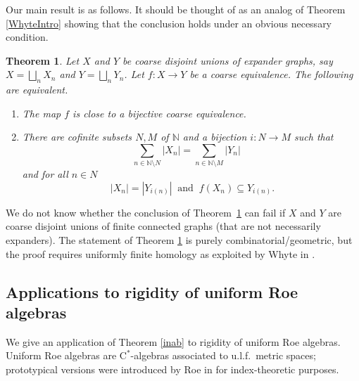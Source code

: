 \documentclass[11pt]{amsart}
\newcommand{\N}{\mathbb{N}}
\numberwithin{equation}{section}
\newtheorem{theorem}{Theorem}[section]
\theoremstyle{definition}
\theoremstyle{remark}
\numberwithin{equation}{section}
\begin{document}

Our main result is as follows.  It should be thought of as an analog of Theorem \ref{WhyteIntro} showing that the conclusion holds under an obvious necessary condition.

\begin{theorem}\label{ThmBijCorExp}
 Let $X$ and $Y$ be coarse disjoint unions of expander graphs, say $X=\bigsqcup_nX_n$ and $Y=\bigsqcup_nY_n$. Let $f\colon X\to Y$ be a coarse equivalence. The following are equivalent.
 \begin{enumerate}
 \item\label{ThmBijCorExpItem1} The map $f$ is close to a bijective coarse equivalence.
 \item\label{ThmBijCorExpItem2} There are cofinite subsets $N,M$ of $\N$ and a bijection $i\colon N\to M$ such that 
 \[\sum_{n\in \N\setminus N}|X_n|=\sum_{n\in \N\setminus M}|Y_n|\quad \]
 and for all $n\in N$
 \[
 \ |X_n|=|Y_{i(n)}|\ \text{ and }\ f(X_n)\subseteq Y_{i(n)}.
 \]
 \end{enumerate} 
\end{theorem}

We do not know whether the conclusion of Theorem~\ref{ThmBijCorExp} can fail if $X$ and $Y$ are coarse disjoint unions of finite connected graphs (that are not necessarily expanders). %
The statement of Theorem \ref{ThmBijCorExp} is purely combinatorial/geometric, but the proof requires uniformly finite homology \cite{Block:1992qp} as exploited by Whyte in \cite{Whyte1999Duke}. 



\subsection{Applications to rigidity of uniform Roe algebras}

We  give an application of Theorem \ref{inab} to rigidity of uniform Roe algebras.  Uniform Roe algebras are $\mathrm{C}^*$-algebras associated to u.l.f.\ metric spaces; prototypical versions were introduced by Roe in \cite{Roe:1988qy} for index-theoretic purposes.  %
\end{document}
